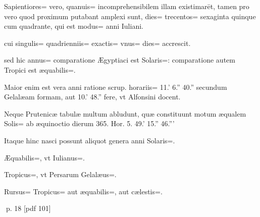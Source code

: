 \begin{parnumbers}
Sapientiores= vero, quanuis= incomprehensibilem illam existimarēt, tamen pro vero quod proximum putabant amplexi sunt, dies= trecentos= sexaginta quinque cum quadrante, qui est modus= anni Iuliani.

cui singulis= quadrienniis= exactis= vnus= dies= accrescit.

sed hic annus= comparatione Ægyptiaci  est Solaris=: comparatione autem Tropici est æquabilis=.

Maior enim est vera anni ratione scrup. horariis= 11.' 6.'' 40.'' secundum Gelalæam formam, aut 10.' 48.'' fere, vt Alfonsini docent.

Neque Prutenicæ tabulæ multum abludunt, quæ constituunt motum æqualem Solis= ab æquinoctio dierum 365. Hor. 5. 49.' 15.'' 46.'''

Itaque hinc nasci possunt aliquot genera anni Solaris=.

Æquabilis=, vt Iulianus=.

Tropicus=, vt Persarum Gelalæus=.

Rursus= Tropicus= aut æquabilis=, aut cælestis=.

\end{parnumbers}
\clearpage
p. 18 [pdf 101]

